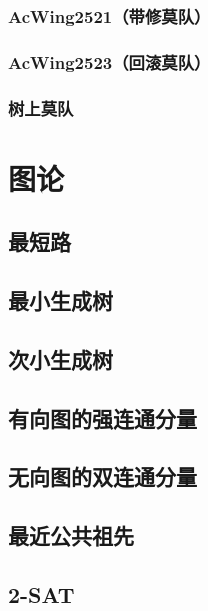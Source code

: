 \documentclass[12pt,a4paper]{article}
\begin{document}
\subsubsection{AcWing2521（带修莫队）}
\begin{spacing}{1.5}

\end{spacing}

\subsubsection{AcWing2523（回滚莫队）}
\begin{spacing}{1.5}

\end{spacing}

\subsubsection{树上莫队}
\begin{spacing}{1.5}

\end{spacing}
\section{图论}
\subsection{最短路}
\subsection{最小生成树}
\subsection{次小生成树}
\subsection{有向图的强连通分量}
\subsection{无向图的双连通分量}
\subsection{最近公共祖先}
\subsection{2-SAT}
\end{document}
